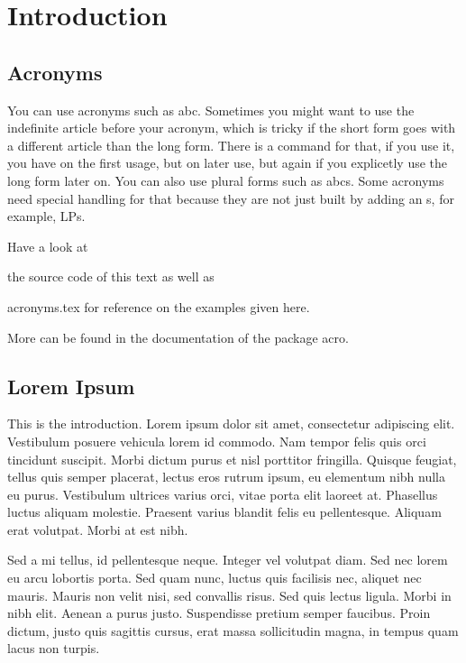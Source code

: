 
\chapter{Introduction}

\section{Acronyms}

You can use acronyms such as \ac{abc}.
Sometimes you might want to use the indefinite article before your acronym, which is tricky if the short form goes with a different article than the long form.
There is a command for that, if you use it, you have  on the first usage, but  on later use, but again  if you explicetly use the long form later on.
You can also use plural forms such as \acp{abc}.
Some acronyms need special handling for that because they are not just built by adding an s, for example, \acfp{LP}.

Have a look at
\begin{enumerate*}[label=(\roman*)]
	\item the source code of this text as well as
	\item acronyms.tex for reference on the examples given here.
\end{enumerate*}
More can be found in the documentation of the package acro.

\section{Lorem Ipsum}

This is the introduction. Lorem ipsum dolor sit amet, consectetur adipiscing elit. Vestibulum posuere vehicula lorem id commodo. Nam tempor felis quis orci tincidunt suscipit. Morbi dictum purus et nisl porttitor fringilla. Quisque feugiat, tellus quis semper placerat, lectus eros rutrum ipsum, eu elementum nibh nulla eu purus. Vestibulum ultrices varius orci, vitae porta elit laoreet at. Phasellus luctus aliquam molestie. Praesent varius blandit felis eu pellentesque. Aliquam erat volutpat. Morbi at est nibh.

Sed a mi tellus, id pellentesque neque. Integer vel volutpat diam. Sed nec lorem eu arcu lobortis porta. Sed quam nunc, luctus quis facilisis nec, aliquet nec mauris. Mauris non velit nisi, sed convallis risus. Sed quis lectus ligula. Morbi in nibh elit. Aenean a purus justo. Suspendisse pretium semper faucibus. Proin dictum, justo quis sagittis cursus, erat massa sollicitudin magna, in tempus quam lacus non turpis.

